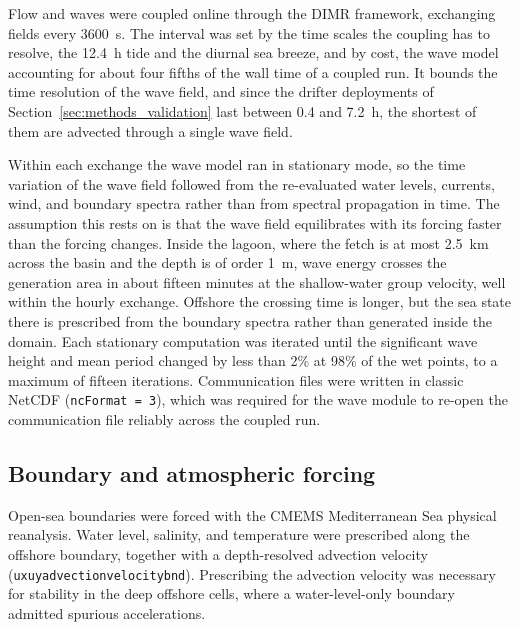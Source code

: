 Flow and waves were coupled online through the DIMR framework, exchanging
fields every 3600~s. The interval was set by the time scales the coupling has
to resolve, the 12.4~h tide and the diurnal sea breeze, and by cost, the wave
model accounting for about four fifths of the wall time of a coupled run. It
bounds the time resolution of the wave field, and since the drifter
deployments of Section~\ref{sec:methods_validation} last between 0.4 and
7.2~h, the shortest of them are advected through a single wave field.

Within each exchange the wave model ran in stationary mode, so the time
variation of the wave field followed from the re-evaluated water levels,
currents, wind, and boundary spectra rather than from spectral propagation in
time. The assumption this rests on is that the wave field equilibrates with
its forcing faster than the forcing changes. Inside the lagoon, where the
fetch is at most 2.5~km across the basin and the depth is of order 1~m, wave
energy crosses the generation area in about fifteen minutes at the
shallow-water group velocity, well within the hourly exchange. Offshore the
crossing time is longer, but the sea state there is prescribed from the
boundary spectra rather than generated inside the domain. Each stationary
computation was iterated until the significant wave height and mean period
changed by less than 2\% at 98\% of the wet points, to a maximum of fifteen
iterations. Communication files were written in classic NetCDF
(\texttt{ncFormat = 3}), which was required for the wave module to re-open the
communication file reliably across the coupled run.

\subsection{Boundary and atmospheric forcing}
\label{sec:methods_forcing}

Open-sea boundaries were forced with the CMEMS Mediterranean Sea physical
reanalysis. Water level, salinity, and temperature were prescribed along the
offshore boundary, together with a depth-resolved advection velocity
(\texttt{uxuyadvectionvelocitybnd}). Prescribing the advection velocity was
necessary for stability in the deep offshore cells, where a water-level-only
boundary admitted spurious accelerations.

